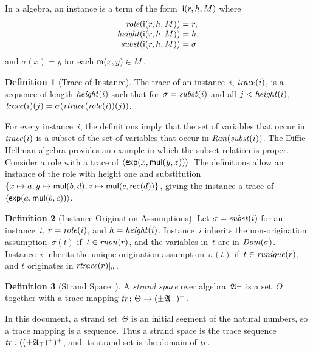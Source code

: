 \documentclass[12pt]{article}
\theoremstyle{definition}
\newtheorem{defn}{Definition}[section]
\begin{document}
In a {\cpsa} algebra, an instance is a term of the form~$\operatorname{\mathsf{i}}(r,h,M)$
where
$$\begin{array}{r@{}c@{}l}
\fn{role}(\cn{i}(r,h,M))&{}={}&r,\\
\fn{height}(\cn{i}(r,h,M))&{}={}&h,\\
\fn{subst}(\cn{i}(r,h,M))&{}={}&\sigma
\end{array}$$
and $\sigma(x)=y$ for each $\operatorname{\mathsf{m}}(x,y)\in M$.

\begin{defn}[Trace of Instance]
The trace of an instance~$i$, $\operatorname{\mathit{trace}}(i)$, is a sequence of
length $\operatorname{\mathit{height}}(i)$ such that for $\sigma=\operatorname{\mathit{subst}}(i)$ and all
$j<\operatorname{\mathit{height}}(i)$,
$\operatorname{\mathit{trace}}(i)(j)=\sigma(\operatorname{\mathit{rtrace}}(\operatorname{\mathit{role}}(i))(j))$.
\end{defn}

For every instance~$i$, the definitions imply that the set of
variables that occur in $\operatorname{\mathit{trace}}(i)$ is a subset of the set of
variables that occur in $\operatorname{\mathit{Ran}}(\operatorname{\mathit{subst}}(i))$.  The Diffie-Hellman
algebra provides an example in which the subset relation is proper.
Consider a role with a trace of $\langle\operatorname{\mathsf{exp}}(x,\operatorname{\mathsf{mul}}(y,z))\rangle$.
The definitions allow an instance of the role with height one and
substitution $\{x\mapsto a, y\mapsto\operatorname{\mathsf{mul}}(b,d),
z\mapsto\operatorname{\mathsf{mul}}(c,\operatorname{\mathsf{rec}}(d))\}$, giving the instance a trace of
$\langle\operatorname{\mathsf{exp}}(a,\operatorname{\mathsf{mul}}(b,c))\rangle$.

\begin{defn}[Instance Origination Assumptions]
Let $\sigma=\operatorname{\mathit{subst}}(i)$ for an instance~$i$, $r=\operatorname{\mathit{role}}(i)$, and
$h=\operatorname{\mathit{height}}(i)$.  Instance~$i$ inherits the non-origination
assumption~$\sigma(t)$ if~$t\in\operatorname{\mathit{rnon}}(r)$, and the variables in~$t$
are in $\operatorname{\mathit{Dom}}(\sigma)$.  Instance~$i$ inherits the unique
origination assumption~$\sigma(t)$ if~$t\in\operatorname{\mathit{runique}}(r)$, and $t$
originates in $\operatorname{\mathit{rtrace}}(r)|_{h}$.
\end{defn}

\begin{defn}[Strand Space~]
A \emph{strand space} over algebra~$\mathfrak A_{\top}$ is a set~$\Theta$
together with a trace mapping $\operatorname{\mathit{tr}}\colon\Theta\to
(\pm\mathfrak A_{\top})^+$.
\end{defn}

In this document, a strand set~$\Theta$ is an initial segment of the
natural numbers, so a trace mapping is a sequence.  Thus a strand
space is the trace sequence $\operatorname{\mathit{tr}}:((\pm\mathfrak A_{\top})^+)^+$, and
its strand set is the domain of $\operatorname{\mathit{tr}}$.
\end{document}
